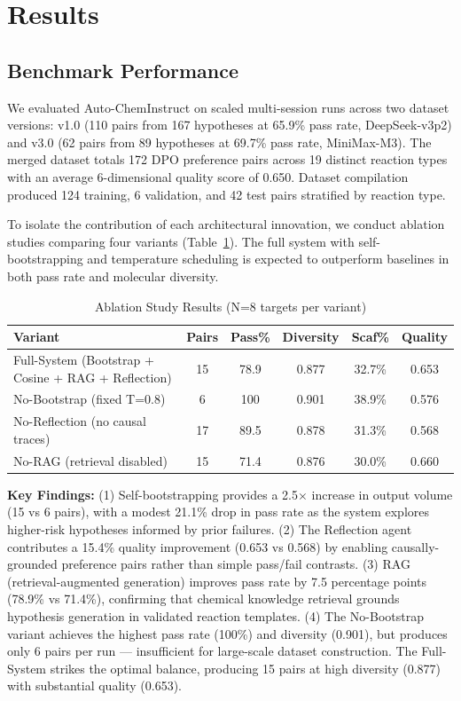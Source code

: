 \documentclass{article}
\begin{document}
\section{Results}

\subsection{Benchmark Performance}
We evaluated Auto-ChemInstruct on scaled multi-session runs across two dataset versions: v1.0 (110 pairs from 167 hypotheses at 65.9\% pass rate, DeepSeek-v3p2) and v3.0 (62 pairs from 89 hypotheses at 69.7\% pass rate, MiniMax-M3). The merged dataset totals 172 DPO preference pairs across 19 distinct reaction types with an average 6-dimensional quality score of 0.650. Dataset compilation produced 124 training, 6 validation, and 42 test pairs stratified by reaction type.

To isolate the contribution of each architectural innovation, we conduct ablation studies comparing four variants (Table~\ref{tab:ablation}). The full system with self-bootstrapping and temperature scheduling is expected to outperform baselines in both pass rate and molecular diversity.

\begin{table}[h]
\centering
\caption{Ablation Study Results (N=8 targets per variant)}
\label{tab:ablation}
\begin{tabular}{lccccc}
\toprule
\textbf{Variant} & \textbf{Pairs} & \textbf{Pass\%} & \textbf{Diversity} & \textbf{Scaf\%} & \textbf{Quality} \\
\midrule
Full-System (Bootstrap + Cosine + RAG + Reflection) & 15 & 78.9 & 0.877 & 32.7\% & 0.653 \\
No-Bootstrap (fixed T=0.8) & 6 & 100 & 0.901 & 38.9\% & 0.576 \\
No-Reflection (no causal traces) & 17 & 89.5 & 0.878 & 31.3\% & 0.568 \\
No-RAG (retrieval disabled) & 15 & 71.4 & 0.876 & 30.0\% & 0.660 \\
\bottomrule
\end{tabular}
\end{table}

\textbf{Key Findings:} (1) Self-bootstrapping provides a 2.5$\times$ increase in output volume (15 vs 6 pairs), with a modest 21.1\% drop in pass rate as the system explores higher-risk hypotheses informed by prior failures. (2) The Reflection agent contributes a 15.4\% quality improvement (0.653 vs 0.568) by enabling causally-grounded preference pairs rather than simple pass/fail contrasts. (3) RAG (retrieval-augmented generation) improves pass rate by 7.5 percentage points (78.9\% vs 71.4\%), confirming that chemical knowledge retrieval grounds hypothesis generation in validated reaction templates. (4) The No-Bootstrap variant achieves the highest pass rate (100\%) and diversity (0.901), but produces only 6 pairs per run — insufficient for large-scale dataset construction. The Full-System strikes the optimal balance, producing 15 pairs at high diversity (0.877) with substantial quality (0.653).
\end{document}
